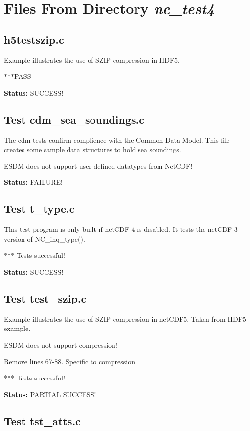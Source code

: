 \chapter{Files From Directory {\textit{nc\_test4}}}

\section{h5testszip.c}

Example illustrates the use of SZIP compression in HDF5.

***PASS

{\bf \large Status: } SUCCESS!

\section{Test cdm\_sea\_soundings.c}

The cdm tests confirm complience with the Common Data Model. This
file creates some sample data structures to hold sea soundings.

ESDM does not support user defined datatypes from NetCDF!

{\bf \large Status: } FAILURE!

\section{Test t\_type.c}

This test program is only built if netCDF-4 is disabled. It tests
   the netCDF-3 version of NC\_inq\_type().

*** Tests successful!

{\bf \large Status: } SUCCESS!

\section{Test test\_szip.c}

Example illustrates the use of SZIP compression in netCDF5.
Taken from HDF5 example.

ESDM does not support compression!

Remove lines 67-88. Specific to compression.

*** Tests successful!

{\bf \large Status: } PARTIAL SUCCESS!

\section{Test tst\_atts.c}


